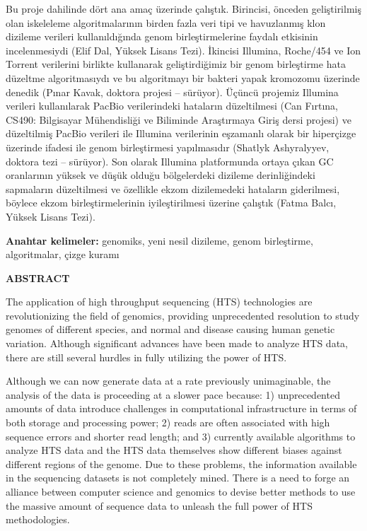 \documentclass[11pt]{article}
\begin{document}
Bu proje dahilinde dört ana amaç üzerinde çalıştık. 
Birincisi, önceden geliştirilmiş olan iskeleleme algoritmalarının birden fazla veri tipi ve havuzlanmış klon dizileme verileri kullanıldığında genom birleştirmelerine faydalı etkisinin incelenmesiydi (Elif Dal, Yüksek Lisans Tezi). İkincisi Illumina, Roche/454 ve Ion Torrent verilerini birlikte kullanarak geliştirdiğimiz bir genom birleştirme hata düzeltme algoritmasıydı ve bu algoritmayı bir bakteri yapak kromozomu üzerinde denedik (Pınar Kavak, doktora projesi -- sürüyor).
Üçüncü projemiz Illumina verileri kullanılarak PacBio verilerindeki hataların düzeltilmesi (Can Fırtına, CS490: Bilgisayar Mühendisliği ve Biliminde Araştırmaya Giriş dersi projesi) ve düzeltilmiş PacBio verileri ile Illumina verilerinin eşzamanlı olarak bir hiperçizge üzerinde ifadesi ile genom birleştirmesi yapılmasıdır (Shatlyk Ashyralyyev, doktora tezi -- sürüyor). Son olarak Illumina platformunda ortaya çıkan GC oranlarının yüksek ve düşük olduğu bölgelerdeki dizileme derinliğindeki sapmaların düzeltilmesi ve özellikle ekzom dizilemedeki hataların giderilmesi, böylece ekzom birleştirmelerinin iyileştirilmesi üzerine çalıştık (Fatma Balcı, Yüksek Lisans Tezi). 

{\bf Anahtar kelimeler:} genomiks, yeni nesil dizileme, genom birleştirme, algoritmalar, çizge kuramı

\newpage
\phantom{ss}
\vspace{-2.5cm}


\begin{center}
{\bf \Large ABSTRACT}
\end{center}
\noindent
The application of high throughput sequencing (HTS) technologies are revolutionizing the field of genomics, providing unprecedented resolution to study genomes of different species, and normal and disease causing human genetic variation. Although significant advances have been made to analyze HTS data, there are still several hurdles in fully utilizing the power of HTS. 

Although we can now generate data at a rate previously unimaginable, the analysis of the data is proceeding at a slower pace because: 1) unprecedented amounts of data introduce challenges in computational infrastructure in terms of both storage and processing power; 2) reads are often associated with high sequence errors and shorter read length; and 3) currently available algorithms to analyze HTS data and the HTS data themselves show different biases against different regions of the genome. Due to these problems, the information available in the sequencing datasets is not completely mined. There is a need to forge an alliance between computer science and genomics to devise better methods to use the massive amount of sequence data to unleash the full power of HTS methodologies.
\end{document}

